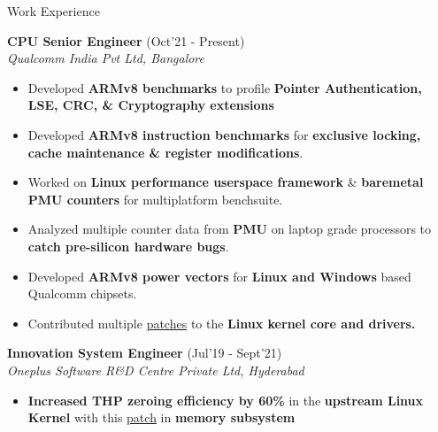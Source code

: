 \begin{rSection}{Work Experience}

\vspace{-.4cm}
 
\item{\bf {\bf CPU Senior Engineer}}     \hfill{(Oct'21 - Present)}\\
\emph{Qualcomm India Pvt Ltd, Bangalore}\\
\vspace{-.01cm}

\begin{itemize}[leftmargin=*]

	\itemsep \sepval
	
	\item Developed {\bf ARMv8 benchmarks} to profile {\bf Pointer Authentication, LSE, CRC, \& Cryptography extensions}

	\item Developed {\bf ARMv8 instruction benchmarks} for {\bf exclusive locking, cache maintenance \& register modifications}.

	\item Worked on {\bf Linux performance userspace framework} \& {\bf baremetal PMU counters} for multiplatform benchsuite.

	\item Analyzed multiple counter data from {\bf PMU} on laptop grade processors to {\bf catch pre-silicon hardware bugs}.

	\item Developed {\bf ARMv8 power vectors} for {\bf Linux and Windows} based Qualcomm chipsets.

	\item Contributed multiple \href{https://lore.kernel.org/all/?q=prathu+baronia}{patches} to the \bf{Linux kernel core and drivers}.
	
\end{itemize}
\vspace{-.2cm}

\item{\bf {\bf Innovation System Engineer}}  \hfill{(Jul'19 - Sept'21)}\\
\emph{Oneplus Software R\&D Centre Private Ltd, Hyderabad}\\
\vspace{-.01cm}

\begin{itemize}[leftmargin=*]

	\itemsep \sepval

	\item {\bf Increased THP zeroing efficiency by 60\%} in the {\bf upstream
		Linux Kernel} with this
		\href{https://git.kernel.org/pub/scm/linux/kernel/git/torvalds/linux.git/commit/?id=d2c20e51e3966bc668ef1ef21fbe90704286c8d0}{patch}
		in {\bf memory subsystem}


\end{itemize}
\end{rSection}
